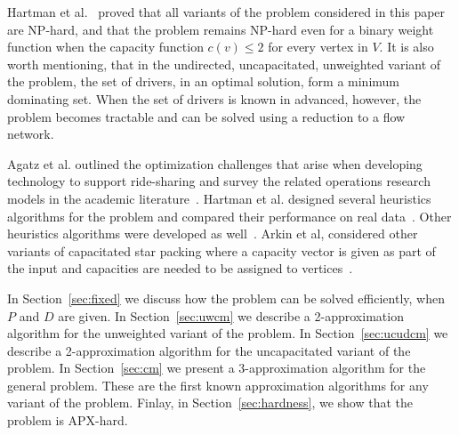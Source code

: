 Hartman et al.~\cite{hartman2013optimal} proved that all variants of the
\emph{\CARPOOL{}} problem considered in this paper are NP-hard,
and that the problem remains NP-hard even for a binary weight function when
the capacity function $c(v) \leq 2$ for every vertex in $V$.
It is also worth mentioning, that in the undirected, uncapacitated, unweighted
variant of the problem, the set of drivers, in an optimal solution,
form a minimum dominating set.
When the set of drivers is known in advanced, however, the problem becomes
tractable and can be solved using a reduction to a flow network.

Agatz et al. outlined the optimization challenges that arise 
when developing technology to support ride-sharing and survey the
related operations research models in the academic literature~\cite{agatz2012optimization}.  
Hartman et al. designed several heuristics algorithms for the 
\CARPOOL{} problem and compared 
their performance on real data~\cite{hartman2014theory}.
Other heuristics algorithms were developed as well~\cite{knapen2014exploiting}.
Arkin et al, considered other variants of capacitated star packing where
a capacity vector is given as part of the input and 
capacities are needed to be assigned to vertices~\cite{arkin2004approximations}.  


In Section~\ref{sec:fixed} we discuss how the problem can be solved efficiently,
when $P$ and $D$ are given.
In Section~\ref{sec:uwcm} we describe a 2-approximation algorithm for the
unweighted variant of the problem.
In Section~\ref{sec:ucudcm} we describe a 2-approximation algorithm
for the uncapacitated variant of the problem. 
In Section~\ref{sec:cm} we present a 3-approximation
algorithm for the general problem. 
These are the first known approximation algorithms for any variant of the problem.
Finlay, in Section~\ref{sec:hardness}, we show that the problem is APX-hard.
